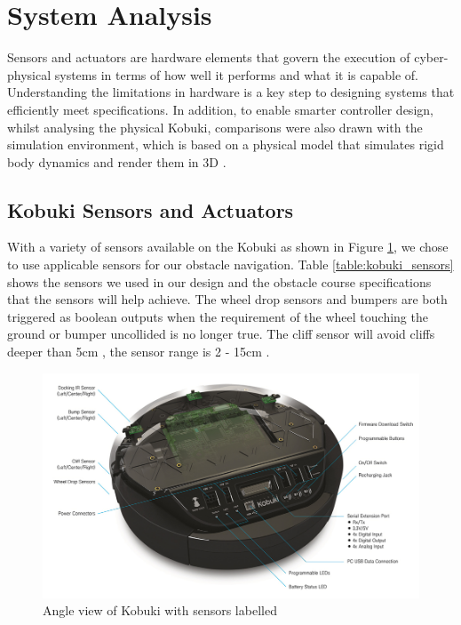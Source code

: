 \section{System Analysis}\label{sec:system}
\vspace{-0.2cm} Sensors and actuators are hardware elements that govern the execution of cyber-physical systems in terms of how well it performs and what it is capable of. Understanding the limitations in hardware is a key step to designing systems that efficiently meet specifications. In addition, to enable smarter controller design, whilst analysing the physical Kobuki, comparisons were also drawn with the simulation environment, which is based on a physical model that simulates rigid body dynamics and render them in 3D \cite[p.~30]{labguide}.

\subsection{Kobuki Sensors and Actuators}
\vspace{-0.2cm} With a variety of sensors available on the Kobuki as shown in Figure \ref{fig:kobuki_sensors}, we chose to use applicable sensors for our obstacle navigation. Table \ref{table:kobuki_sensors} shows the sensors we used in our design and the obstacle course specifications that the sensors will help achieve. The wheel drop sensors and bumpers are both triggered as boolean outputs when the requirement of the wheel touching the ground or bumper uncollided is no longer true. The cliff sensor will avoid cliffs deeper than 5cm \cite{kobuki_datasheet}, the sensor range is 2 - 15cm \cite{kobukisensors}.
\begin{figure}[H]
    \centering
    \includegraphics[width=12cm]{Images/kobuki_spec.jpg}
    \caption{Angle view of Kobuki with sensors labelled \cite{kobuki_spec_pic}}
    \label{fig:kobuki_sensors}
\end{figure}

